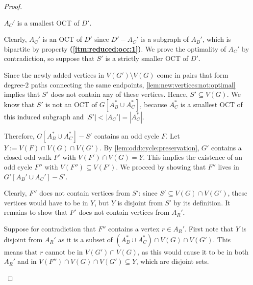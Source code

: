 \begin{proof}
	\begin{claim}
		$A_C'$ is a smallest OCT of $D'$.
	\end{claim}
	\begin{claimproof}
		Clearly, $A_C'$ is an OCT of $D'$ since $D' - A_C'$ is a subgraph of $A_B'$, which is bipartite by property \textbf{(\ref{itm:reduced:occ:1})}. We prove the optimality of $A_C'$ by contradiction, so suppose that $S'$ is a strictly smaller OCT of $D'$.
		
		Since the newly added vertices in $V(G') \setminus V(G)$ come in pairs that form degree-$2$ paths connecting the same endpoints, \cref{lem:new:vertices:not:optimal} implies that $S'$ does not contain any of these vertices. Hence, $S' \subseteq V(G)$. We know that $S'$ is not an OCT of $G[A_B^\ast \cup A_C^\ast]$, because $A_C^\ast$ is a smallest OCT of this induced subgraph and $|S'| < |A_C'| = |A_C^\ast|$.
		
		Therefore, $G[A_B^\ast \cup A_C^\ast] - S'$ contains an odd cycle $F$. Let $Y := V(F) \cap V(G) \cap V(G')$. By \cref{lem:odd:cycle:preservation}, $G'$ contains a closed odd walk $F'$ with $V(F') \cap V(G) = Y$. This implies the existence of an odd cycle $F''$ with $V(F'') \subseteq V(F')$. We proceed by showing that $F''$ lives in $G'[A_B' \cup A_C'] - S'$.
		
		Clearly, $F''$ does not contain vertices from $S'$: since $S' \subseteq V(G) \cap V(G')$, these vertices would have to be in $Y$, but $Y$ is disjoint from $S'$ by its definition. It remains to show that $F'$ does not contain vertices from $A_R'$. 
		
		Suppose for contradiction that $F''$ contains a vertex $r \in A_R'$. First note that $Y$ is disjoint from $A_R'$ as it is a subset of $(A_B^\ast \cup A_C^\ast) \cap V(G) \cap V(G')$. This means that $r$ cannot be in $V(G') \cap V(G)$, as this would cause it to be in both $A_R'$ and in $V(F'') \cap V(G) \cap V(G') \subseteq Y$, which are disjoint sets.
		

\end{claimproof}
\end{proof}
